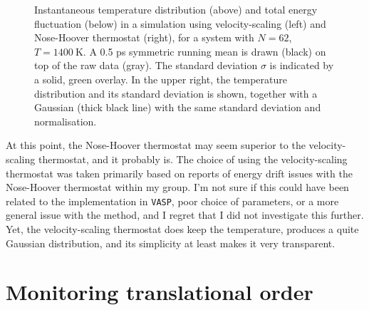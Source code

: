 \documentclass[11pt,bibliography=totoc,index=totoc]{scrbook}   %
\newcommand{\vasp}{{\texttt{VASP}}} %
\begin{document}
\begin{figure}[htbp]
  \centering
  \caption{
    Instantaneous temperature distribution (above) and total energy fluctuation (below) 
    in a simulation using velocity-scaling (left) and Nose-Hoover thermostat (right),
    for a system with $N=62$, $T=\SI{1400}{\kelvin}$.
    A 0.5 ps symmetric running mean is drawn (black) on top of the raw data (gray). 
    The standard deviation $\sigma$ is indicated by a solid, green overlay. 
    In the upper right, the temperature distribution and its standard deviation is shown, 
    together with a Gaussian (thick black line) with the same standard deviation and normalisation.
   }
  \label{fig:md_test_temperature}
\end{figure}

At this point, the Nose-Hoover thermostat may seem superior to the velocity-scaling thermostat, 
and it probably is.
The choice of using the velocity-scaling thermostat was taken primarily based on reports of energy drift issues with the Nose-Hoover thermostat within my group. 
I'm not sure if this could have been related to the implementation in {\vasp}, poor choice of parameters, or a more general issue with the method, 
and I regret that I did not investigate this further.
Yet, the velocity-scaling thermostat does keep the temperature, produces a quite Gaussian distribution, and its simplicity at least makes it very transparent.



%
\section{Monitoring translational order}\label{sec:translational-order}
%
\end{document}
